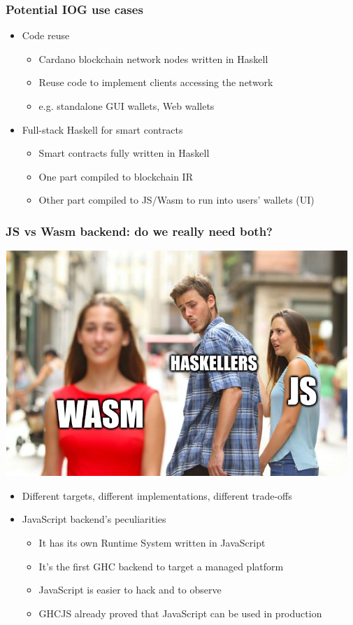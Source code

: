 \documentclass{beamer}
\begin{document}
\begin{frame}
\frametitle{Potential IOG use cases}
\begin{itemize}
\item Code reuse
\begin{itemize}
\item Cardano blockchain network nodes written in Haskell
\item Reuse code to implement clients accessing the network
\item e.g. standalone GUI wallets, Web wallets
\end{itemize}
\item Full-stack Haskell for smart contracts
\begin{itemize}
\item Smart contracts fully written in Haskell
\item One part compiled to blockchain IR
\item Other part compiled to JS/Wasm to run into users’ wallets (UI)
\end{itemize}
\end{itemize}
\end{frame}


\begin{frame}
\frametitle{ JS vs Wasm backend: do we really need both?}
\begin{center}
\includegraphics[scale=0.2]{images/js_vs_wasm.png}
\end{center}
\begin{itemize}
\item Different targets, different implementations, different trade-offs
\item JavaScript backend’s peculiarities
\begin{itemize}
\item It has its own Runtime System written in JavaScript
\item It’s the first GHC backend to target a managed platform
\item JavaScript is easier to hack and to observe
\item GHCJS already proved that JavaScript can be used in production
\end{itemize}
\end{itemize}
\end{frame}
\end{document}
